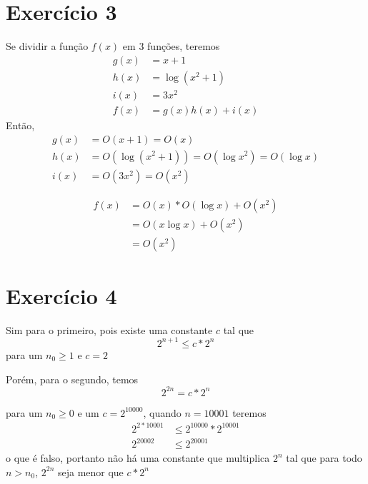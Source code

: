 \documentclass{article}
\begin{document}
\section{Exercício 3}
Se dividir a função $f(x)$ em 3 funções, teremos
\begin{equation}
    \begin{split}
        g(x) & = x + 1\\
        h(x) & = \log(x^2 + 1)\\
        i(x) & = 3x^2\\
        f(x) & = g(x)h(x) + i(x)
    \end{split}
\end{equation}
Então,
\begin{equation}
    \begin{split}
        g(x) & = O(x + 1) = O(x)\\
        h(x) & = O(\log(x^2 + 1)) = O(\log x^2) = O(\log x)\\
        i(x) & = O(3x^2) = O(x^2)
    \end{split}
\end{equation}

\begin{equation}
    \begin{split}
        f(x) & = O(x)*O(\log x) + O(x^2)\\
        & = O(x\log x) + O(x^2)\\
        & = O(x^2)
    \end{split}
\end{equation}

\section{Exercício 4}
Sim para o primeiro, pois existe uma constante $c$ tal que
\begin{equation}
    2^{n+1} \leq c * 2^n
\end{equation}
\hspace*{40pt}para um $n_0 \geq 1$ e $c = 2$

Porém, para o segundo, temos
\begin{equation}
    2^{2n} = c * 2^n
\end{equation}

para um $n_0 \geq 0$ e um $c = 2^{10000}$, quando $n = 10001$ teremos
\begin{equation}
    \begin{split}
        2^{2*10001} &\leq 2^{10000} * 2^{10001}\\
        2^{20002} & \leq 2^{20001}
    \end{split}
\end{equation}
o que é falso, portanto não há uma constante que multiplica $2^n$ tal que
para todo $n > n_0$, $2^{2n}$ seja menor que $c*2^n$
\end{document}
